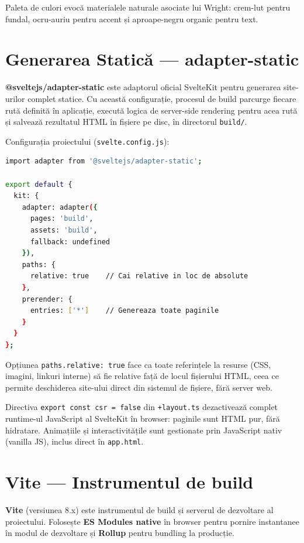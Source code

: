 \documentclass[12pt,a4paper]{report}
\begin{document}
Paleta de culori evocă materialele naturale asociate lui Wright: crem-lut
pentru fundal, ocru-auriu pentru accent și aproape-negru organic pentru text.

\section{Generarea Statică --- adapter-static}

\textbf{@sveltejs/adapter-static} este adaptorul oficial SvelteKit pentru
generarea site-urilor complet statice. Cu această configurație, procesul de
build parcurge fiecare rută definită în aplicație, execută logica de
server-side rendering pentru acea rută și salvează rezultatul HTML în fișiere
pe disc, în directorul \texttt{build/}.

Configurația proiectului (\texttt{svelte.config.js}):

\begin{lstlisting}[language=bash,
  caption={Configurația SvelteKit pentru generare statică}]
import adapter from '@sveltejs/adapter-static';

export default {
  kit: {
    adapter: adapter({
      pages: 'build',
      assets: 'build',
      fallback: undefined
    }),
    paths: {
      relative: true    // Cai relative in loc de absolute
    },
    prerender: {
      entries: ['*']    // Genereaza toate paginile
    }
  }
};
\end{lstlisting}

Opțiunea \texttt{paths.relative: true} face ca toate referințele la resurse
(CSS, imagini, linkuri interne) să fie relative față de locul fișierului HTML,
ceea ce permite deschiderea site-ului direct din sistemul de fișiere, fără
server web.

Directiva \texttt{export const csr = false} din \texttt{+layout.ts} dezactivează
complet runtime-ul JavaScript al SvelteKit în browser: paginile sunt HTML pur,
fără hidratare. Animațiile și interactivitățile sunt gestionate prin JavaScript
nativ (vanilla JS), inclus direct în \texttt{app.html}.

\section{Vite --- Instrumentul de build}

\textbf{Vite} (versiunea 8.x) este instrumentul de build și serverul de
dezvoltare al proiectului. Folosește \textbf{ES Modules native} în browser
pentru pornire instantanee în modul de dezvoltare și \textbf{Rollup} pentru
bundling la producție.
\end{document}
